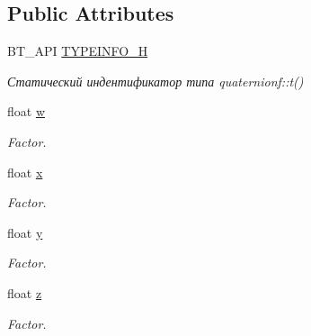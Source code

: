 \subsection*{Public Attributes}
\begin{DoxyCompactItemize}
\item 
\hypertarget{classbt_1_1quaternionf_ac0f28a88a30469c73100bd2a897313c7}{B\-T\-\_\-\-A\-P\-I \hyperlink{classbt_1_1quaternionf_ac0f28a88a30469c73100bd2a897313c7}{T\-Y\-P\-E\-I\-N\-F\-O\-\_\-\-H}}\label{classbt_1_1quaternionf_ac0f28a88a30469c73100bd2a897313c7}

\begin{DoxyCompactList}\small\item\em Статический индентификатор типа quaternionf\-::t() \end{DoxyCompactList}\item 
\hypertarget{classbt_1_1quaternionf_a7db348a9e3015953cfb962caf4ec1520}{float \hyperlink{classbt_1_1quaternionf_a7db348a9e3015953cfb962caf4ec1520}{w}}\label{classbt_1_1quaternionf_a7db348a9e3015953cfb962caf4ec1520}

\begin{DoxyCompactList}\small\item\em Factor. \end{DoxyCompactList}\item 
\hypertarget{classbt_1_1quaternionf_a53d4e1147083628ba7b2f45f31d415c6}{float \hyperlink{classbt_1_1quaternionf_a53d4e1147083628ba7b2f45f31d415c6}{x}}\label{classbt_1_1quaternionf_a53d4e1147083628ba7b2f45f31d415c6}

\begin{DoxyCompactList}\small\item\em Factor. \end{DoxyCompactList}\item 
\hypertarget{classbt_1_1quaternionf_a36bc07d1bd8c6b3f31c06f4c51a917e2}{float \hyperlink{classbt_1_1quaternionf_a36bc07d1bd8c6b3f31c06f4c51a917e2}{y}}\label{classbt_1_1quaternionf_a36bc07d1bd8c6b3f31c06f4c51a917e2}

\begin{DoxyCompactList}\small\item\em Factor. \end{DoxyCompactList}\item 
\hypertarget{classbt_1_1quaternionf_a8edcb3d6f86709cd66436c1577cd09c5}{float \hyperlink{classbt_1_1quaternionf_a8edcb3d6f86709cd66436c1577cd09c5}{z}}\label{classbt_1_1quaternionf_a8edcb3d6f86709cd66436c1577cd09c5}

\begin{DoxyCompactList}\small\item\em Factor. \end{DoxyCompactList}\end{DoxyCompactItemize}
